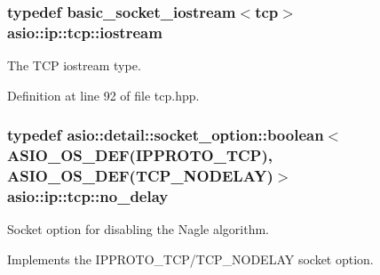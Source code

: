 \hypertarget{classasio_1_1ip_1_1tcp_a80eba1234024033d7a8bc5c6eee35a1b}{}
\subsubsection[{iostream}]{\setlength{\rightskip}{0pt plus 5cm}typedef {\bf basic\+\_\+socket\+\_\+iostream}$<${\bf tcp}$>$ {\bf asio\+::ip\+::tcp\+::iostream}}\label{classasio_1_1ip_1_1tcp_a80eba1234024033d7a8bc5c6eee35a1b}


The T\+C\+P iostream type. 



Definition at line 92 of file tcp.\+hpp.

\hypertarget{classasio_1_1ip_1_1tcp_a9a35d1c7bb67c0ec1481336cfa826c2e}{}
\subsubsection[{no\+\_\+delay}]{\setlength{\rightskip}{0pt plus 5cm}typedef {\bf asio\+::detail\+::socket\+\_\+option\+::boolean}$<$ {\bf A\+S\+I\+O\+\_\+\+O\+S\+\_\+\+D\+E\+F}(I\+P\+P\+R\+O\+T\+O\+\_\+\+T\+C\+P), {\bf A\+S\+I\+O\+\_\+\+O\+S\+\_\+\+D\+E\+F}(T\+C\+P\+\_\+\+N\+O\+D\+E\+L\+A\+Y)$>$ {\bf asio\+::ip\+::tcp\+::no\+\_\+delay}}\label{classasio_1_1ip_1_1tcp_a9a35d1c7bb67c0ec1481336cfa826c2e}


Socket option for disabling the Nagle algorithm. 

Implements the I\+P\+P\+R\+O\+T\+O\+\_\+\+T\+C\+P/\+T\+C\+P\+\_\+\+N\+O\+D\+E\+L\+A\+Y socket option.

